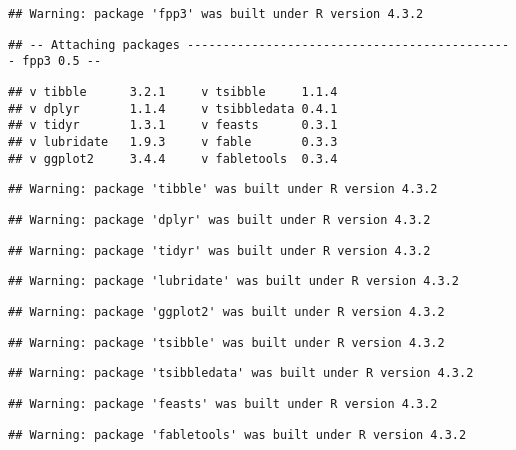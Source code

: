 \documentclass[
]{article}
\begin{document}
\begin{verbatim}
## Warning: package 'fpp3' was built under R version 4.3.2
\end{verbatim}

\begin{verbatim}
## -- Attaching packages ---------------------------------------------- fpp3 0.5 --
\end{verbatim}

\begin{verbatim}
## v tibble      3.2.1     v tsibble     1.1.4
## v dplyr       1.1.4     v tsibbledata 0.4.1
## v tidyr       1.3.1     v feasts      0.3.1
## v lubridate   1.9.3     v fable       0.3.3
## v ggplot2     3.4.4     v fabletools  0.3.4
\end{verbatim}

\begin{verbatim}
## Warning: package 'tibble' was built under R version 4.3.2
\end{verbatim}

\begin{verbatim}
## Warning: package 'dplyr' was built under R version 4.3.2
\end{verbatim}

\begin{verbatim}
## Warning: package 'tidyr' was built under R version 4.3.2
\end{verbatim}

\begin{verbatim}
## Warning: package 'lubridate' was built under R version 4.3.2
\end{verbatim}

\begin{verbatim}
## Warning: package 'ggplot2' was built under R version 4.3.2
\end{verbatim}

\begin{verbatim}
## Warning: package 'tsibble' was built under R version 4.3.2
\end{verbatim}

\begin{verbatim}
## Warning: package 'tsibbledata' was built under R version 4.3.2
\end{verbatim}

\begin{verbatim}
## Warning: package 'feasts' was built under R version 4.3.2
\end{verbatim}

\begin{verbatim}
## Warning: package 'fabletools' was built under R version 4.3.2
\end{verbatim}
\end{document}
